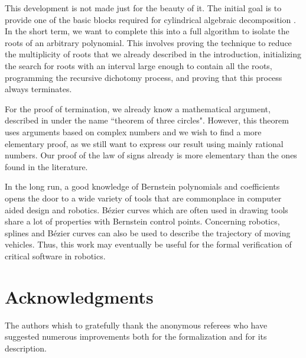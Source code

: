 \documentclass{mscs}
\begin{document}
This development is not made just for the beauty of it. The initial
goal is to provide one of the basic blocks required for cylindrical
algebraic decomposition \cite{bpr, cadcoq}. In the short term, we
want to complete this
into a full algorithm to isolate the roots of an arbitrary
polynomial. This involves proving the technique to reduce the
multiplicity of roots that we already described in the introduction,
initializing the search for roots with an interval large enough to
contain all the roots, programming the recursive dichotomy process,
and proving that this process always terminates.

For the proof of termination, we already know a mathematical argument,
described in \cite{bpr} under the name ``theorem of three
circles". However, this theorem uses arguments based on complex
numbers and we wish to find a more elementary proof, as we still want
to express our result using mainly rational numbers.  Our proof of the
law of signs already is more elementary than the ones found in
the literature.

In the long run, a good knowledge of Bernstein polynomials and
coefficients opens the door to a wide variety of tools that are
commonplace in computer aided design and robotics. B\'ezier curves
which are often used in drawing tools share a lot of properties with
Bernstein control points. Concerning robotics, splines and B\'ezier
curves can also be used to describe the trajectory of moving
vehicles.  Thus, this work may eventually be useful for the formal
verification of critical software in robotics.

\section{Acknowledgments} The authors whish to gratefully thank the
anonymous referees who have suggested numerous improvements both for
the formalization and for its description.



\end{document}
